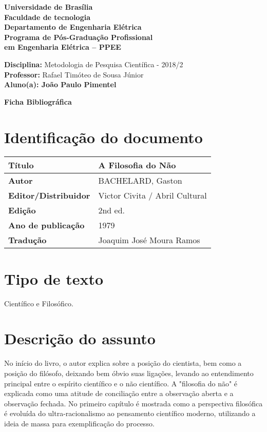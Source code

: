 \documentclass[11pt]{article}
\begin{document}
\noindent
\begin{center}
\Large\textbf{Universidade de Brasília}\\
\Large\textbf{Faculdade de tecnologia}\\
\Large\textbf{Departamento de Engenharia Elétrica}\\
\Large\textbf{Programa de Pós-Graduação Profissional \\
	em Engenharia Elétrica -- PPEE}\\
\end{center}

\large{
\noindent
\textbf{Disciplina:} Metodologia de Pesquisa Científica - 2018/2\\
\textbf{Professor:} Rafael Timóteo de Sousa Júnior \\
\textbf{Aluno(a): João Paulo Pimentel}}\\

\begin{center}
\Large\textbf{Ficha Bibliográfica}
\end{center}
\normalsize

\section{Identificação do documento}
\begin{center}
	\begin{tabular}{|l|l|} \hline
		\textbf{Título} & A Filosofia do Não\cite{Bachelard1979} \\ \hline
		\textbf{Autor} & BACHELARD, Gaston \\ \hline
		\textbf{Editor/Distribuidor} & Victor Civita / Abril Cultural
 \\ \hline
		\textbf{Edição} & 2nd ed. \\ \hline
		\textbf{Ano de publicação} & 1979 \\ \hline
		\textbf{Tradução} &  Joaquim José Moura Ramos \\ \hline
	\end{tabular}
\end{center}

\section{Tipo de texto}
    Científico e Filosófico.

\section{Descrição do assunto}
    No início do livro, o autor explica sobre a posição do cientista, bem como a posição do filósofo, deixando bem óbvio suas ligações, levando ao entendimento principal entre o espírito científico e o não científico. A "filosofia do não" é explicada como uma atitude de conciliação entre a observação aberta e a observação fechada. No primeiro capítulo é mostrada como a perspectiva filosófica é evoluída do ultra-racionalismo ao pensamento científico moderno, utilizando a ideia de massa para exemplificação do processo.
\end{document}
